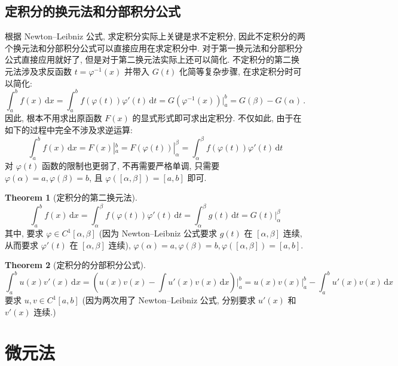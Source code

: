 \documentclass{book}
\newcommand{\dd}{\,\mathrm{d}}
\numberwithin{equation}{section}
\numberwithin{figure}{section}
\theoremstyle{definition}
\newtheorem{theorem}{Theorem}[section]
\begin{document}
\subsection{定积分的换元法和分部积分公式}
根据 Newton--Leibniz 公式, 求定积分实际上关键是求不定积分, 因此不定积分的两个换元法和分部积分公式可以直接应用在求定积分中. 对于第一换元法和分部积分公式直接应用就好了, 但是对于第二换元法实际上还可以简化. 不定积分的第二换元法涉及求反函数 $t=\varphi^{-1}(x)$ 并带入 $G(t)$ 化简等复杂步骤, 在求定积分时可以简化:
\begin{equation*}
  \int_{a}^{b} f(x) \dd x=\int_{a}^{b} f(\varphi(t))\varphi'(t) \dd t=G(\varphi^{-1}(x))|_a^b=G(\beta)-G(\alpha)\,.
\end{equation*}
因此, 根本不用求出原函数 $F(x)$ 的显式形式即可求出定积分. 不仅如此, 由于在如下的过程中完全不涉及求逆运算:
\begin{equation*}
  \int_{a}^{b} f(x) \dd x=F(x)|_a^b=F(\varphi(t))|_\alpha^\beta=\int_{\alpha}^{\beta} f(\varphi(t))\varphi'(t) \dd t
\end{equation*}
对 $\varphi(t)$ 函数的限制也更弱了, 不再需要严格单调, 只需要 $\varphi(\alpha)=a,\varphi(\beta)=b$, 且 $\varphi([\alpha,\beta])=[a,b]$ 即可.
\begin{theorem}[定积分的第二换元法]
  \begin{equation*}
    \int_{a}^{b} f(x) \dd x=\int_{\alpha}^{\beta} f(\varphi(t))\varphi'(t) \dd t= \int_{\alpha}^{\beta} g(t) \dd t=G(t)|_\alpha^\beta
  \end{equation*}
  其中, 要求 $\varphi\in C^1[\alpha,\beta]$ (因为 Newton--Leibniz 公式要求 $g(t)$ 在 $[\alpha,\beta]$ 连续, 从而要求 $\varphi'(t)$ 在 $[\alpha,\beta]$ 连续), $\varphi(\alpha)=a,\varphi(\beta)=b,\varphi([\alpha,\beta])=[a,b]$.
\end{theorem}

\begin{theorem}[定积分的分部积分公式]
  \begin{equation*}
    \int_{a}^{b} u(x)v'(x) \dd x=\left( u(x)v(x)-\int u'(x)v(x)\dd x \right)\big|_a^b=u(x)v(x)|_a^b-\int_{a}^{b} u'(x)v(x) \dd x
  \end{equation*}
  要求 $u,v\in C^1[a,b]$ (因为两次用了 Newton--Leibniz 公式, 分别要求 $u'(x)$ 和 $v'(x)$ 连续.)
\end{theorem}
\section{微元法}
\end{document}
